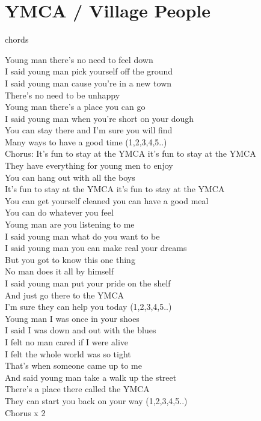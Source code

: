 \section{YMCA / Village People}\label{sec:ymca}
  {\small chords}
  
  \Aminor
  \Fmajor
  \Gseven
  
   Young man there's no need to feel down\\
  I said  young man pick yourself off the ground\\
  I said  young man cause you're in a new town\\
  There's no  need to be unhappy\\
   Young man there's a place you can go\\
  I said  young man when you're short on your dough\\
  You can  stay there and I'm sure you will find\\
  Many  ways to have a good time (1,2,3,4,5..)\\
  Chorus: It's fun to stay at the  YMCA it's fun to stay at the  YMCA\\
  They have  everything for young men to enjoy\\
  You can  hang out with all the boys\\
  It's fun to stay at the  YMCA it's fun to stay at the  YMCA\\
  You can  get yourself cleaned you can have a good meal\\
  You can  do whatever you feel\\
   Young man are you listening to me\\
  I said  young man what do you want to be\\
  I said  young man you can make real your dreams\\
  But you  got to know this one thing\\
   No man does it all by himself\\
  I said  young man put your pride on the shelf\\
  And just  go there to the YMCA\\
  I'm  sure they can help you today (1,2,3,4,5..)\\
   Young man I was once in your shoes\\
  I said  I was down and out with the blues\\
  I felt  no man cared if I were alive\\
  I felt  the whole world was so tight\\
  That's when  someone came up to me\\
  And said  young man take a walk up the street\\
  There's a  place there called the YMCA\\
  They can  start you back on your way (1,2,3,4,5..)\\
  Chorus x 2
